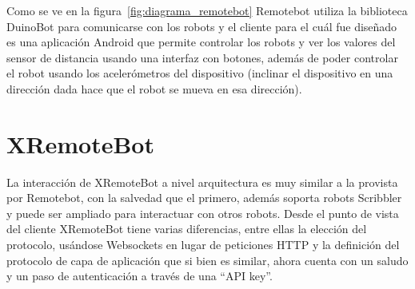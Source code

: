 Como se ve en la figura~\ref{fig:diagrama_remotebot} Remotebot utiliza la
biblioteca DuinoBot para comunicarse con los robots y el cliente para el cuál
fue diseñado es una aplicación Android que permite controlar los robots
y ver los valores del sensor de distancia usando una interfaz con botones,
además de poder controlar el robot usando los acelerómetros del dispositivo
(inclinar el dispositivo en una dirección dada hace que el robot se mueva
en esa dirección).

\section{XRemoteBot}\label{sec:xremotebot}

La interacción de XRemoteBot a nivel arquitectura es muy similar a la provista por Remotebot,
con la salvedad que el primero, además soporta robots Scribbler y puede ser
ampliado para interactuar con otros robots. Desde el punto de vista del cliente
XRemoteBot tiene varias diferencias, entre ellas la elección del protocolo,
usándose Websockets en lugar de peticiones HTTP y la definición del protocolo
de capa de aplicación que si bien es similar, ahora cuenta con un saludo y
un paso de autenticación a través de una ``API key''.



